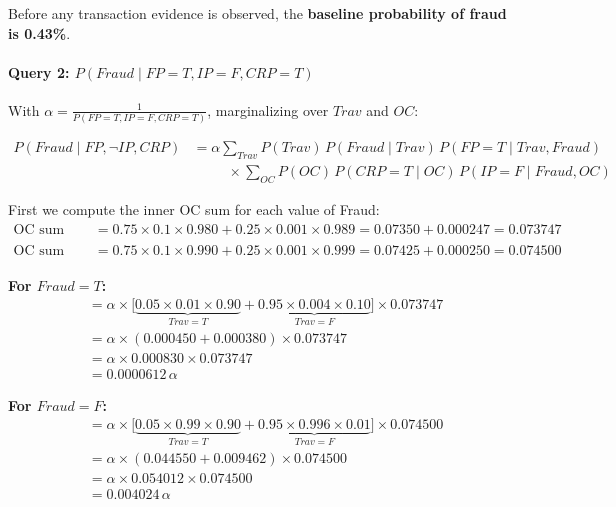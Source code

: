 \documentclass[12pt]{article}
\begin{document}
Before any transaction evidence is observed, the \textbf{baseline probability of fraud is 0.43\%}.

\paragraph{Query 2: $P(\textit{Fraud}\mid\textit{FP}{=}T,\textit{IP}{=}F,\textit{CRP}{=}T)$}

With $\alpha=\tfrac{1}{P(\textit{FP}{=}T,\textit{IP}{=}F,\textit{CRP}{=}T)}$,
marginalizing over $\textit{Trav}$ and $\textit{OC}$:

\begin{align*}
P(\textit{Fraud}\mid\textit{FP},\neg\textit{IP},\textit{CRP})
&=\alpha\sum_{\textit{Trav}}P(\textit{Trav})\,P(\textit{Fraud}\mid\textit{Trav})\,
  P(\textit{FP}{=}T\mid\textit{Trav},\textit{Fraud})\\
&\hspace{30pt}\times
  \sum_{\textit{OC}}P(\textit{OC})\,P(\textit{CRP}{=}T\mid\textit{OC})\,
  P(\textit{IP}{=}F\mid\textit{Fraud},\textit{OC})
\end{align*}

First we compute the inner OC sum for each value of Fraud:
\begin{align*}
\text{OC sum (Fraud=T)}&=0.75\times0.1\times0.980+0.25\times0.001\times0.989
 =0.07350+0.000247=0.073747\\
\text{OC sum (Fraud=F)}&=0.75\times0.1\times0.990+0.25\times0.001\times0.999
 =0.07425+0.000250=0.074500
\end{align*}

\textbf{For $\textit{Fraud}=T$:}
\begin{align*}
&=\alpha\times\bigl[\underbrace{0.05\times0.01\times0.90}_{\textit{Trav}=T}
  +\underbrace{0.95\times0.004\times0.10}_{\textit{Trav}=F}\bigr]
  \times0.073747\\
&=\alpha\times(0.000450+0.000380)\times0.073747\\
&=\alpha\times0.000830\times0.073747\\
&=0.0000612\,\alpha
\end{align*}

\textbf{For $\textit{Fraud}=F$:}
\begin{align*}
&=\alpha\times\bigl[\underbrace{0.05\times0.99\times0.90}_{\textit{Trav}=T}
  +\underbrace{0.95\times0.996\times0.01}_{\textit{Trav}=F}\bigr]
  \times0.074500\\
&=\alpha\times(0.044550+0.009462)\times0.074500\\
&=\alpha\times0.054012\times0.074500\\
&=0.004024\,\alpha
\end{align*}
\end{document}
